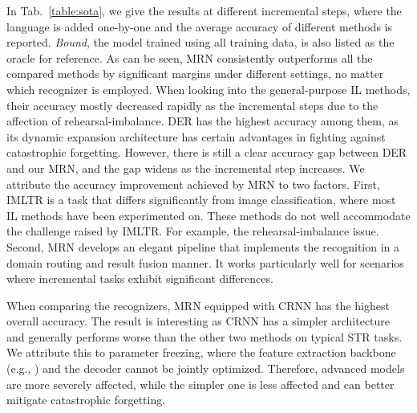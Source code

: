 \documentclass[10pt,twocolumn,letterpaper]{article}
\begin{document}
In Tab.~\ref{table:sota}, we give the results at different incremental steps, where the language is added one-by-one and the average accuracy of different methods is reported. \emph{Bound}, the model trained using all training data, is also listed as the oracle for reference. As can be seen, MRN consistently outperforms all the compared methods by significant margins under different settings, no matter which recognizer is employed. When looking into the general-purpose IL methods, their accuracy mostly decreased rapidly as the incremental steps due to the affection of rehearsal-imbalance. DER has the highest accuracy among them, as its dynamic expansion architecture has certain advantages in fighting against catastrophic forgetting. However, there is still a clear accuracy gap between DER and our MRN, and the gap widens as the incremental step increases. We attribute the accuracy improvement achieved by MRN to two factors. First, IMLTR is a task that differs significantly from image classification, where most IL methods have been experimented on. These methods do not well accommodate the challenge raised by IMLTR. For example, the rehearsal-imbalance issue. Second, MRN develops an elegant pipeline that implements the recognition in a domain routing and result fusion manner. It works particularly well for scenarios where incremental tasks exhibit significant differences. 


When comparing the recognizers, MRN equipped with CRNN has the highest overall accuracy. The result is interesting as CRNN has a simpler architecture and generally performs worse than the other two methods on typical STR tasks. We attribute this to parameter freezing, where the feature extraction backbone (e.g., ) and the decoder cannot be jointly optimized. Therefore, advanced models are more severely affected, while the simpler one is less affected and can better mitigate catastrophic forgetting.
\end{document}
